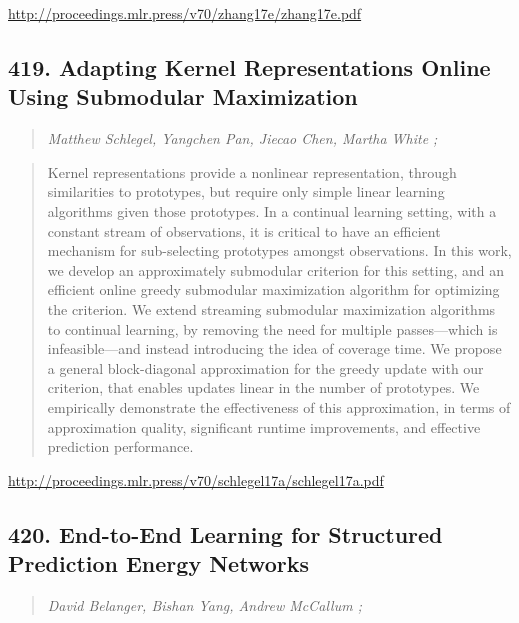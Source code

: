 \documentclass{article}
\begin{document}
\href{http://proceedings.mlr.press/v70/zhang17e/zhang17e.pdf}{http://proceedings.mlr.press/v70/zhang17e/zhang17e.pdf}

\subsection{419. Adapting Kernel Representations Online Using Submodular Maximization}

\begin{quote}
\footnotesize{\textit{Matthew Schlegel, Yangchen Pan, Jiecao Chen, Martha White ;}}

\end{quote}

\begin{quote}
    Kernel representations provide a nonlinear representation, through similarities to prototypes, but require only simple linear learning algorithms given those prototypes. In a continual learning setting, with a constant stream of observations, it is critical to have an efficient mechanism for sub-selecting prototypes amongst observations. In this work, we develop an approximately submodular criterion for this setting, and an efficient online greedy submodular maximization algorithm for optimizing the criterion. We extend streaming submodular maximization algorithms to continual learning, by removing the need for multiple passes—which is infeasible—and instead introducing the idea of coverage time. We propose a general block-diagonal approximation for the greedy update with our criterion, that enables updates linear in the number of prototypes. We empirically demonstrate the effectiveness of this approximation, in terms of approximation quality, significant runtime improvements, and effective prediction performance.  
\end{quote}

\href{http://proceedings.mlr.press/v70/schlegel17a/schlegel17a.pdf}{http://proceedings.mlr.press/v70/schlegel17a/schlegel17a.pdf}

\subsection{420. End-to-End Learning for Structured Prediction Energy Networks}

\begin{quote}
\footnotesize{\textit{David Belanger, Bishan Yang, Andrew McCallum ;}}

\end{quote}
\end{document}
